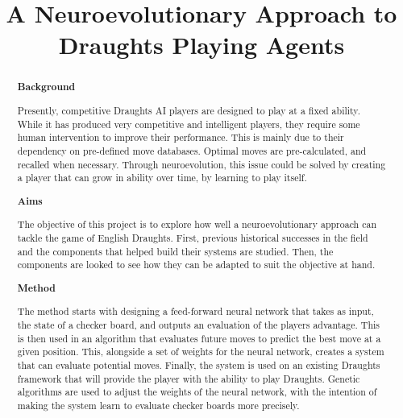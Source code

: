 \documentclass[12pt,a4paper]{article}
\title{A Neuroevolutionary Approach to Draughts Playing Agents}
\author{}
\date{}
\begin{document}
    \maketitle


\begin{abstract}


    {\bf Background}

    Presently, competitive Draughts AI players are designed to play at a fixed ability. While it has produced very competitive and intelligent players, they require some human intervention to improve their performance. 
    This is mainly due to their dependency on pre-defined move databases. Optimal moves are pre-calculated, and recalled when necessary. Through neuroevolution, this issue could be solved by creating a player that can grow in ability over time, by learning to play itself.
    
    {\bf Aims}

    The objective of this project is to explore how well a neuroevolutionary approach can tackle the game of English Draughts. First, previous historical successes in the field and the components that helped build their systems are studied. Then, the components are looked to see how they can be adapted to suit the objective at hand. 

    {\bf Method}

    The method starts with designing a feed-forward neural network that takes as input, the state of a checker board, and outputs an evaluation of the players advantage. This is then used in an algorithm that evaluates future moves to predict the best move at a given position. This, alongside a set of weights for the neural network, creates a system that can evaluate potential moves. Finally, the system is used on an existing Draughts framework that will provide the player with the ability to play Draughts. Genetic algorithms are used to adjust the weights of the neural network, with the intention of making the system learn to evaluate checker boards more precisely. 
    

\end{abstract}
\end{document}
